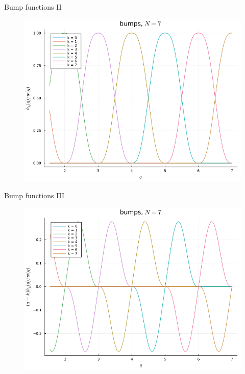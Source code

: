 \documentclass{beamer}
\begin{document}
\begin{frame}{Bump functions II}
    \begin{figure}[H]
        \centering
            \includegraphics[scale=0.33]{img/BUMP/BUMP_hw_N=7.png}
        \label{fig:bumpxy}
    \end{figure}
\end{frame}

\begin{frame}{Bump functions III}
    \begin{figure}[H]
        \centering
            \includegraphics[scale=0.33]{img/BUMP/BUMP_qhw_N=7.png}
        \label{fig:bumpxy}
    \end{figure}
\end{frame}
\end{document}
